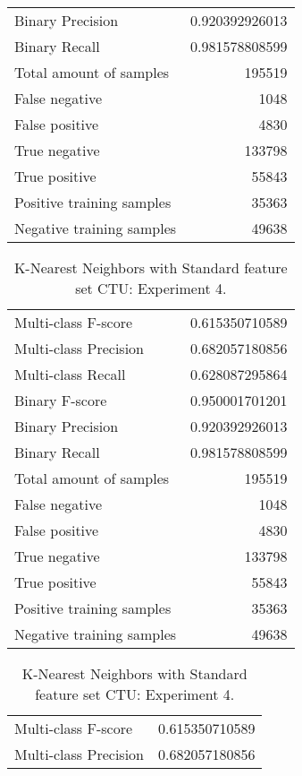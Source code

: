 \begin{table}[H]
\begin{minipage}{0.5\textwidth}
\begin{tabular}{l r}
Binary Precision & 0.920392926013 \\
Binary Recall & 0.981578808599 \\
\midrule
Total amount of samples & 195519 \\
False negative & 1048 \\
False positive & 4830 \\
True negative & 133798 \\
True positive & 55843 \\
\midrule
Positive training samples & 35363 \\
Negative training samples & 49638 \\
\bottomrule
\end{tabular}
\end{minipage}
\end{table}
\begin{table}[H]
\begin{minipage}{0.5\textwidth}
\caption{K-Nearest Neighbors with Standard feature set CTU: Experiment 3.}
\centering
\begin{tabular}{l r}
\toprule
Multi-class F-score & 0.615350710589 \\
Multi-class Precision & 0.682057180856 \\
Multi-class Recall & 0.628087295864 \\
\midrule
Binary F-score & 0.950001701201 \\
Binary Precision & 0.920392926013 \\
Binary Recall & 0.981578808599 \\
\midrule
Total amount of samples & 195519 \\
False negative & 1048 \\
False positive & 4830 \\
True negative & 133798 \\
True positive & 55843 \\
\midrule
Positive training samples & 35363 \\
Negative training samples & 49638 \\
\bottomrule
\end{tabular}
\end{minipage}
\hfillx
\begin{minipage}{0.5\textwidth}
\caption{K-Nearest Neighbors with Standard feature set CTU: Experiment 4.}
\centering
\begin{tabular}{l r}
\toprule
Multi-class F-score & 0.615350710589 \\
Multi-class Precision & 0.682057180856 \\

\end{tabular}
\end{minipage}
\end{table}
